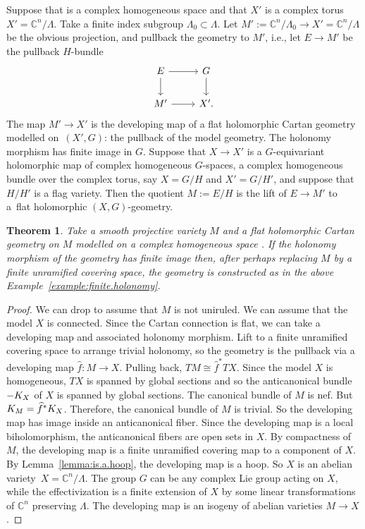 \documentclass[11pt]{article}
\numberwithin{equation}{section}
\providecommand{\C}{\mathbb{C}}
\numberwithin{equation}{section}
\newtheorem{Theorem}{Theorem}[section]
\renewcommand{\C}{\mathbb{C}}
\begin{document}
\begin{Example}\label{example:finite.holonomy}
Suppose that  is a complex homogeneous space and that $X'$ is a complex torus $X' = \C^{n}/\Lambda$.
Take a finite index subgroup $\Lambda_0 \subset \Lambda$.
Let $M' := \C^{n}/\Lambda_0 \to X' = \C^{n}/\Lambda$ be the obvious projection, and pullback the geometry to $M'$, i.e., let $E \longrightarrow
 M'$ be the pullback $H$-bundle
\[
\begin{tikzcd}
E \arrow{r}\arrow{d} & G \arrow{d} \\
M' \arrow{r} & X'.
\end{tikzcd}
\]
The map $M' \longrightarrow
 X'$ is the developing map of a flat holomorphic Cartan geometry modelled on~$(X', G)$: the pullback of the model geometry.
The holonomy morphism has finite image in $G$.
Suppose that $X \to X'$ is a $G$-equivariant holomorphic map of complex homogeneous $G$-spaces, a complex
homogeneous bundle over the complex torus, say $X = G/H$ and $X' = G/H'$, and suppose that $H/H'$ is a flag variety.
Then the quotient $M := E/H$ is the lift of $E \to M'$ to a~flat holomorphic $(X, G)$-geometry.
\end{Example}

\begin{Theorem}\label{theorem:finite.holonomy}
Take a smooth projective variety $M$ and a flat holomorphic Cartan geometry on $M$ modelled on a complex homogeneous space .
If the holonomy morphism of the geometry has finite image then, after perhaps replacing $M$ by a finite unramified covering space, the geometry is constructed as in the above Example~{\rm \ref{example:finite.holonomy}}.
\end{Theorem}

\begin{proof}
We can drop to assume that $M$ is not uniruled.
We can assume that the model $X$ is connected.
Since the Cartan connection is flat, we can take a developing map and associated holonomy morphism.
Lift to a finite unramified covering space to arrange trivial holonomy, so the geometry is the pullback via a developing map
$\widehat{f} \colon M \to X$.
Pulling back, ${TM \cong \widehat{f}^* TX}$.
Since the model $X$ is homogeneous, $TX$ is spanned by global sections and so the anticanonical bundle~$\acb{X}$ of $X$ is spanned by global sections.
The canonical bundle of $M$ is nef.
But~${\cb{M} = \widehat{f}^* \cb{X}}$.
Therefore, the canonical bundle of $M$ is trivial.
So the developing map has image inside an anticanonical fiber.
Since the developing map is a local biholomorphism, the anticanonical fibers are open sets in $X$.
By compactness of $M$, the developing map is a finite unramified covering map to a component of $X$.
By Lemma~\ref{lemma:is.a.hoop}, the developing map is a hoop.
So $X$ is an abelian variety~${X = \C^{n}/\Lambda}$.
The group $G$ can be any complex Lie group acting on $X$, while the effectivization is a finite extension of $X$ by some linear transformations of $\C^{n}$ preserving $\Lambda$.
The developing map is an isogeny of abelian varieties $M \to X$.
\end{proof}
\end{document}
